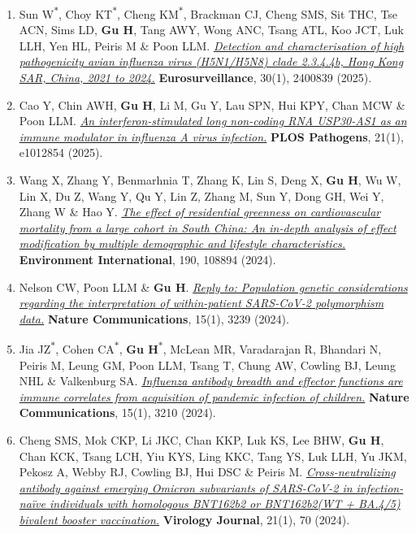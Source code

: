 \documentclass[letterpaper,10pt]{article}
\newcommand{\yr}[1]{\makebox[0pt][l]{\hspace{\linewidth}\hspace{5pt}\small\bfseries #1}\ignorespaces}
\newcommand{\journal}[1]{\textbf{#1}}
\newcounter{firstauthorcount}
\newcommand{\faitem}{\refstepcounter{firstauthorcount}\item}
\begin{document}
\begin{enumerate}[itemsep=0.5pt, parsep=0pt]
      \item Sun W\textsuperscript{$*$}, Choy KT\textsuperscript{$*$}, Cheng KM\textsuperscript{$*$}, Brackman CJ, Cheng SMS, Sit THC, Tse ACN, Sims LD, \textbf{Gu H}, Tang AWY, Wong ANC, Tsang ATL, Koo JCT, Luk LLH, Yen HL, Peiris M \& Poon LLM. \href{https://doi.org/10.2807/1560-7917.ES.2025.30.1.2400839}{\textit{Detection and characterisation of high pathogenicity avian influenza virus (H5N1/H5N8) clade 2.3.4.4b, Hong Kong SAR, China, 2021 to 2024.}} \journal{Eurosurveillance}, 30(1), 2400839 (2025).
      \item Cao Y, Chin AWH, \textbf{Gu H}, Li M, Gu Y, Lau SPN, Hui KPY, Chan MCW \& Poon LLM. \href{https://doi.org/10.1371/journal.ppat.1012854}{\textit{An interferon-stimulated long non-coding RNA USP30-AS1 as an immune modulator in influenza A virus infection.}} \journal{PLOS Pathogens}, 21(1), e1012854 (2025).
      \item \yr{2024}Wang X, Zhang Y, Benmarhnia T, Zhang K, Lin S, Deng X, \textbf{Gu H}, Wu W, Lin X, Du Z, Wang Y, Qu Y, Lin Z, Zhang M, Sun Y, Dong GH, Wei Y, Zhang W \& Hao Y. \href{https://doi.org/10.1016/j.envint.2024.108894}{\textit{The effect of residential greenness on cardiovascular mortality from a large cohort in South China: An in-depth analysis of effect modification by multiple demographic and lifestyle characteristics.}} \journal{Environment International}, 190, 108894 (2024).
      \item Nelson CW, Poon LLM \& \textbf{Gu H}. \href{https://doi.org/10.1038/s41467-024-46262-3}{\textit{Reply to: Population genetic considerations regarding the interpretation of within-patient SARS-CoV-2 polymorphism data.}} \journal{Nature Communications}, 15(1), 3239 (2024).
      \faitem Jia JZ\textsuperscript{$*$}, Cohen CA\textsuperscript{$*$}, \textbf{Gu H}\textsuperscript{$*$}, McLean MR, Varadarajan R, Bhandari N, Peiris M, Leung GM, Poon LLM, Tsang T, Chung AW, Cowling BJ, Leung NHL \& Valkenburg SA. \href{https://doi.org/10.1038/s41467-024-47590-0}{\textit{Influenza antibody breadth and effector functions are immune correlates from acquisition of pandemic infection of children.}} \journal{Nature Communications}, 15(1), 3210 (2024).
      \item Cheng SMS, Mok CKP, Li JKC, Chan KKP, Luk KS, Lee BHW, \textbf{Gu H}, Chan KCK, Tsang LCH, Yiu KYS, Ling KKC, Tang YS, Luk LLH, Yu JKM, Pekosz A, Webby RJ, Cowling BJ, Hui DSC \& Peiris M. \href{https://doi.org/10.1186/s12985-024-02335-9}{\textit{Cross-neutralizing antibody against emerging Omicron subvariants of SARS-CoV-2 in infection-naïve individuals with homologous BNT162b2 or BNT162b2(WT + BA.4/5) bivalent booster vaccination.}} \journal{Virology Journal}, 21(1), 70 (2024).

\end{enumerate}
\end{document}

